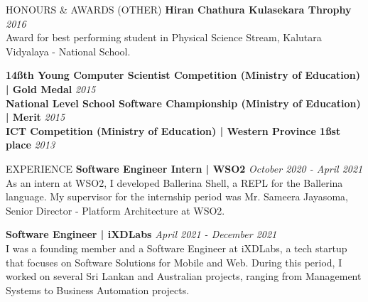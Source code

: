 \documentclass{cv}
\begin{document}
\begin{rSection}{HONOURS \& AWARDS (OTHER)}
    {\bf Hiran Chathura Kulasekara Throphy}                                                         \hfill {\em 2016}
    \\Award for best performing student in Physical Science Stream, Kalutara Vidyalaya - National School. \par
    {\bf 14\ss{th} Young Computer Scientist Competition (Ministry of Education) | Gold Medal}     \hfill {\em 2015} \\
    {\bf National Level School Software Championship (Ministry of Education) | Merit}     \hfill {\em 2015} \\
    {\bf ICT Competition (Ministry of Education) | Western Province 1\ss{st} place}      \hfill {\em 2013}
\end{rSection}


\begin{rSection}{EXPERIENCE}
    {\bf Software Engineer Intern | WSO2}                                \hfill {\em October 2020 - April 2021}
    \\ As an intern at WSO2, I developed Ballerina Shell, a REPL for the Ballerina language. My supervisor for the internship period was Mr. Sameera Jayasoma, Senior Director - Platform Architecture at WSO2. \par

    {\bf Software Engineer | iXDLabs}                  \hfill {\em April 2021 - December 2021}
    \\ I was a founding member and a Software Engineer at iXDLabs, a tech startup that focuses on Software Solutions for Mobile and Web. During this period, I worked on several Sri Lankan and Australian projects, ranging from Management Systems to Business Automation projects.
    \\ 
\end{rSection}

\end{document}
